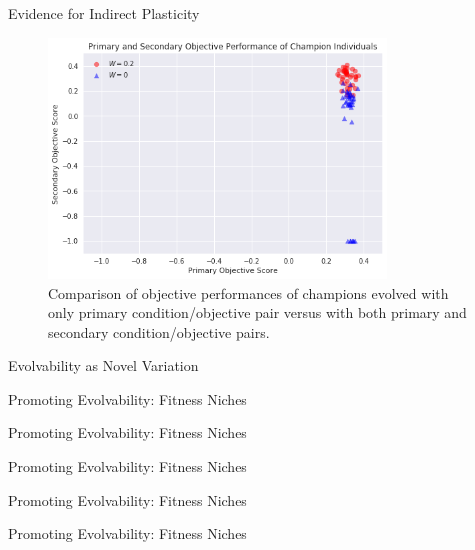 \begin{frame}{Evidence for Indirect Plasticity}
\begin{figure}
    \centering
    \includegraphics[width=0.8\textwidth]{img/scatter_indirect}
 	\captionsetup{singlelinecheck=off,justification=raggedright}
  	\caption{Comparison of objective performances of champions evolved with only primary condition/objective pair versus with both primary and secondary condition/objective pairs.}
    \label{fig:es_p0}
\end{figure}
\end{frame}

\begin{frame}{Evolvability as Novel Variation}
  
\end{frame}

\begin{frame}{Promoting Evolvability: Fitness Niches}
	
\end{frame}

\begin{frame}{Promoting Evolvability: Fitness Niches}
\vfill
	
    \vfill
\end{frame}

\begin{frame}{Promoting Evolvability: Fitness Niches}
\vspace{2ex}
	
\end{frame}

\begin{frame}{Promoting Evolvability: Fitness Niches}
\vspace{2ex}	

\end{frame}

\begin{frame}{Promoting Evolvability: Fitness Niches}
	
\end{frame}
